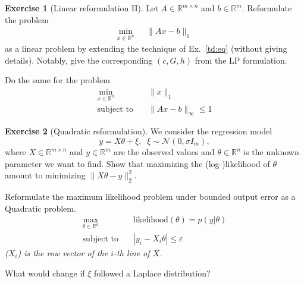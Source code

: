 \documentclass[a4paper,twoside,10pt]{amsart}
\numberwithin{equation}{section} %
\numberwithin{figure}{section} %
\numberwithin{table}{section} %
\theoremstyle{definition}
\newtheorem{q_td}{Exercise }
\begin{document}
\newpage

\begin{q_td}[Linear reformulation II]\label{td:ref2}
Let $A\in\mathbb{R}^{m\times n}$ and $ b\in\mathbb{R}^m$. Reformulate the problem 
\begin{align*}
\min_{x\in\mathbb{R}^n}  & ~~~ \|Ax-b\|_1
\end{align*}
as a linear problem by extending the technique of Ex.~\ref{td:eq} (without giving details). Notably, give the corresponding $(c,G,h)$ from the LP formulation. 


Do the same for the problem 
\begin{align*}
\min_{x\in\mathbb{R}^n}  & ~~~ \|x\|_1\\
\text{subject to } & ~~~ \|Ax-b\|_\infty  \leq 1
\end{align*}

\end{q_td}

\vspace*{0.5cm}

\begin{q_td}[Quadratic reformulation]\label{td:ref2}
We consider the regression model
$$ y=X\theta+\xi,\;\;\xi\sim \mathcal{N}(0, \sigma I_m), $$
where $X\in \mathbb{R}^{m\times n}$ and $y\in \mathbb{R}^m$ are the observed values and $\theta\in \mathbb{R}^n$ is the unknown parameter we want to find. Show that maximizing the (log-)likelihood of $\theta$ amount to minimizing $\|X\theta-y\|_2^2$.  

Reformulate the maximum likelihood problem under bounded output error as a Quadratic problem. 
\begin{align*}
\max_{\theta \in\mathbb{R}^n}  & ~~~ \text{likelihood}(\theta) = p(y|\theta) \\
\text{subject to } & ~~~  | y_i - X_i \theta |  \leq \varepsilon
\end{align*}
\emph{($X_i$) is the row vector of the $i$-th line of $X$.}


What would change if $\xi$ followed a Laplace distribution?
\end{q_td}

\vspace*{0.5cm}
\end{document}
